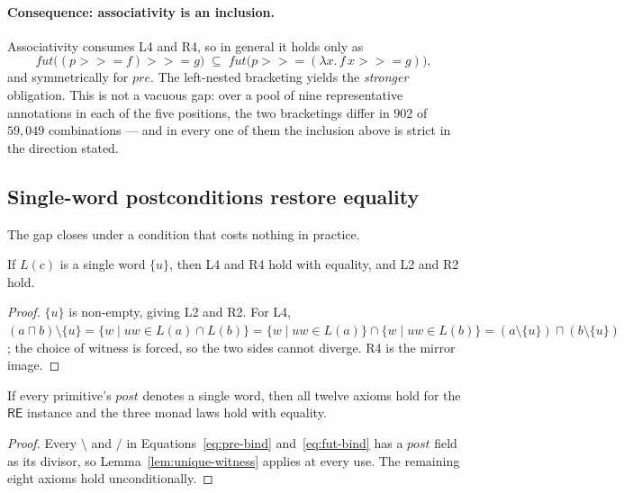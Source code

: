 \documentclass[acmsmall,screen]{acmart}
\newcommand{\RE}{\mathsf{RE}}
\newcommand{\pre}{\mathit{pre}}
\newcommand{\post}{\mathit{post}}
\newcommand{\fut}{\mathit{fut}}
\newcommand{\lquot}{\mathbin{\setminus}}   %
\newcommand{\rquot}{\mathbin{/}}           %
\begin{document}
\paragraph{Consequence: associativity is an inclusion.}
Associativity consumes L4 and R4, so in general it holds only as
\[
  \fut\bigl((p \mathbin{>\!\!>\!\!=} f) \mathbin{>\!\!>\!\!=} g\bigr)
  \;\subseteq\;
  \fut\bigl(p \mathbin{>\!\!>\!\!=} (\lambda x.\, f\,x \mathbin{>\!\!>\!\!=} g)\bigr),
\]
and symmetrically for $\pre$.
The left-nested bracketing yields the \emph{stronger} obligation.
This is not a vacuous gap: over a pool of nine representative annotations in
each of the five positions, the two bracketings differ in $902$ of $59{,}049$
combinations --- and in every one of them the inclusion above is strict in
the direction stated.

\subsection{Single-word postconditions restore equality}
\label{sec:single-word}

The gap closes under a condition that costs nothing in practice.

\begin{lemma}
\label{lem:unique-witness}
If $L(c)$ is a single word $\{u\}$, then L4 and R4 hold with equality, and
L2 and R2 hold.
\end{lemma}
\begin{proof}
$\{u\}$ is non-empty, giving L2 and R2.
For L4, $(a \sqcap b) \lquot \{u\} = \{w \mid uw \in L(a) \cap L(b)\}
= \{w \mid uw \in L(a)\} \cap \{w \mid uw \in L(b)\}
= (a \lquot \{u\}) \sqcap (b \lquot \{u\})$;
the choice of witness is forced, so the two sides cannot diverge.
R4 is the mirror image.
\end{proof}

\begin{theorem}
\label{thm:single-word}
If every primitive's $\post$ denotes a single word, then all twelve axioms
hold for the $\RE$ instance and the three monad laws hold with equality.
\end{theorem}
\begin{proof}
Every $\lquot$ and $\rquot$ in Equations~\eqref{eq:pre-bind}
and~\eqref{eq:fut-bind} has a $\post$ field as its divisor, so
Lemma~\ref{lem:unique-witness} applies at every use.
The remaining eight axioms hold unconditionally.
\end{proof}
\end{document}
